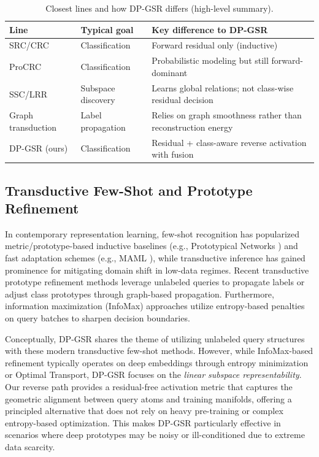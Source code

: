 \documentclass[10pt,comsoc]{IEEEtran}
\begin{document}
\begin{table}[t]
\centering
\caption{Closest lines and how DP-GSR differs (high-level summary).}
\label{tab:closest}
\begin{tabular}{l|l|l}
\hline
Line & Typical goal & Key difference to DP-GSR \\ \hline
SRC/CRC \cite{wright2009robust, zhang2011sparse} & Classification & Forward residual only (inductive) \\ 
ProCRC \cite{cai2016probabilistic} & Classification & Probabilistic modeling but still forward-dominant \\ 
SSC/LRR \cite{elhamifar2013ssc, liu2013low} & Subspace discovery & Learns global relations; not class-wise residual decision \\ 
Graph transduction \cite{zhu2003semi, zhou2004learning} & Label propagation & Relies on graph smoothness rather than reconstruction energy \\ 
DP-GSR (ours) & Classification & Residual + class-aware reverse activation with fusion \\
\hline
\end{tabular}
\end{table}

\subsection{Transductive Few-Shot and Prototype Refinement}
In contemporary representation learning, few-shot recognition has popularized metric/prototype-based inductive baselines (e.g., Prototypical Networks \cite{snell2017prototypical}) and fast adaptation schemes (e.g., MAML \cite{finn2017maml}), while transductive inference has gained prominence for mitigating domain shift in low-data regimes. Recent transductive prototype refinement methods \cite{hu2020leveraging, liu2018learning} leverage unlabeled queries to propagate labels or adjust class prototypes through graph-based propagation. Furthermore, information maximization (InfoMax) approaches \cite{boudiaf2020information} utilize entropy-based penalties on query batches to sharpen decision boundaries. 

Conceptually, DP-GSR shares the theme of utilizing unlabeled query structures with these modern transductive few-shot methods. However, while InfoMax-based refinement typically operates on deep embeddings through entropy minimization or Optimal Transport, DP-GSR focuses on the \textit{linear subspace representability}. Our reverse path provides a residual-free activation metric that captures the geometric alignment between query atoms and training manifolds, offering a principled alternative that does not rely on heavy pre-training or complex entropy-based optimization. This makes DP-GSR particularly effective in scenarios where deep prototypes may be noisy or ill-conditioned due to extreme data scarcity.
\end{document}
